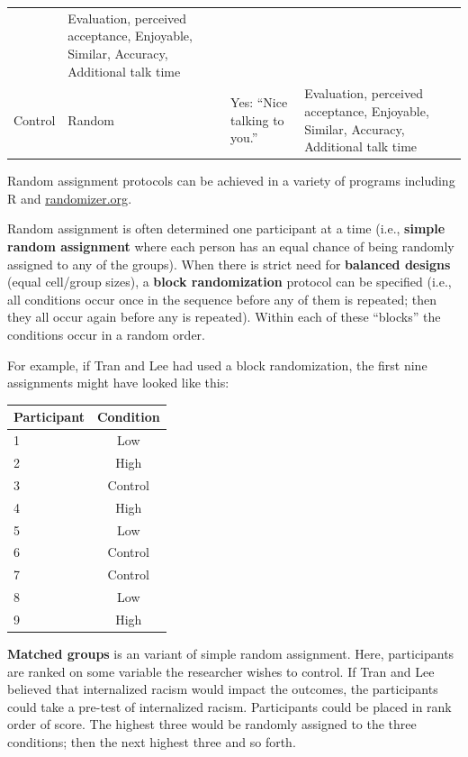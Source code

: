 \documentclass[
  english,
]{book}
\begin{document}
\begin{longtable}[]{@{}llll@{}}
\begin{minipage}[t]{0.20\columnwidth}
\end{minipage} & \begin{minipage}[t]{0.30\columnwidth}\raggedright
Evaluation, perceived acceptance, Enjoyable, Similar, Accuracy, Additional talk time\strut
\end{minipage}\tabularnewline
\begin{minipage}[t]{0.14\columnwidth}\raggedright
Control\strut
\end{minipage} & \begin{minipage}[t]{0.24\columnwidth}\raggedright
Random\strut
\end{minipage} & \begin{minipage}[t]{0.20\columnwidth}\raggedright
Yes: ``Nice talking to you.''\strut
\end{minipage} & \begin{minipage}[t]{0.30\columnwidth}\raggedright
Evaluation, perceived acceptance, Enjoyable, Similar, Accuracy, Additional talk time\strut
\end{minipage}\tabularnewline
\bottomrule
\end{longtable}

Random assignment protocols can be achieved in a variety of programs including R and \href{https://www.randomizer.org/}{randomizer.org}.

Random assignment is often determined one participant at a time (i.e., \textbf{simple random assignment} where each person has an equal chance of being randomly assigned to any of the groups). When there is strict need for \textbf{balanced designs} (equal cell/group sizes), a \textbf{block randomization} protocol can be specified (i.e., all conditions occur once in the sequence before any of them is repeated; then they all occur again before any is repeated). Within each of these ``blocks'' the conditions occur in a random order.

For example, if Tran and Lee had used a block randomization, the first nine assignments might have looked like this:

\begin{longtable}[]{@{}lc@{}}
\toprule
Participant & Condition\tabularnewline
\midrule
\endhead
1 & Low\tabularnewline
2 & High\tabularnewline
3 & Control\tabularnewline
4 & High\tabularnewline
5 & Low\tabularnewline
6 & Control\tabularnewline
7 & Control\tabularnewline
8 & Low\tabularnewline
9 & High\tabularnewline
\bottomrule
\end{longtable}

\textbf{Matched groups} is an variant of simple random assignment. Here, participants are ranked on some variable the researcher wishes to control. If Tran and Lee believed that internalized racism would impact the outcomes, the participants could take a pre-test of internalized racism. Participants could be placed in rank order of score. The highest three would be randomly assigned to the three conditions; then the next highest three and so forth.
\end{document}
